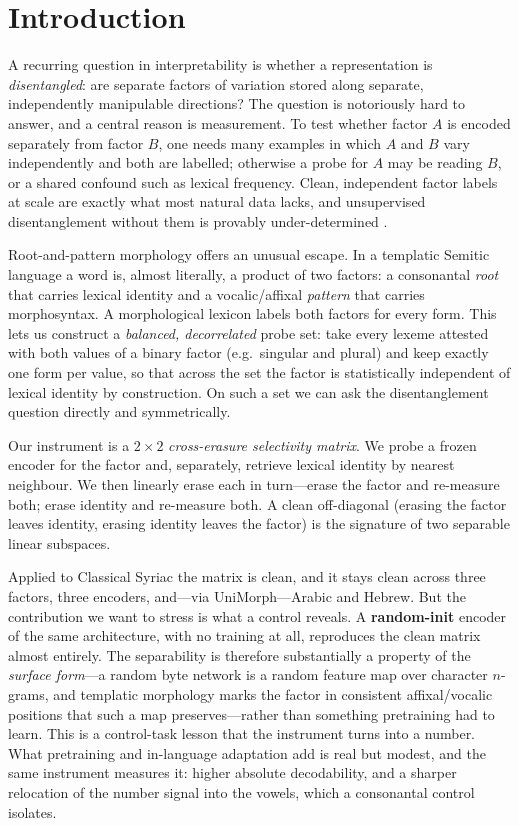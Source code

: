 \documentclass[11pt]{article}
\begin{document}
\section{Introduction}
\label{sec:intro}

A recurring question in interpretability is whether a representation is
\emph{disentangled}: are separate factors of variation stored along separate,
independently manipulable directions? The question is notoriously hard to answer,
and a central reason is measurement. To test whether factor $A$ is encoded
separately from factor $B$, one needs many examples in which $A$ and $B$ vary
independently and both are labelled; otherwise a probe for $A$ may be reading $B$,
or a shared confound such as lexical frequency. Clean, independent factor labels at
scale are exactly what most natural data lacks, and unsupervised disentanglement
without them is provably under-determined \citep{locatello2019challenging}.

Root-and-pattern morphology offers an unusual escape. In a templatic Semitic
language a word is, almost literally, a product of two factors: a consonantal
\emph{root} that carries lexical identity and a vocalic/affixal \emph{pattern} that
carries morphosyntax. A morphological lexicon labels both factors for every form.
This lets us construct a \emph{balanced, decorrelated} probe set: take every lexeme
attested with both values of a binary factor (e.g.\ singular and plural) and keep
exactly one form per value, so that across the set the factor is statistically
independent of lexical identity by construction. On such a set we can ask the
disentanglement question directly and symmetrically.

Our instrument is a $2\times2$ \emph{cross-erasure selectivity matrix}. We probe a
frozen encoder for the factor and, separately, retrieve lexical identity by nearest
neighbour. We then linearly erase each in turn---erase the factor and re-measure
both; erase identity and re-measure both. A clean off-diagonal (erasing the factor
leaves identity, erasing identity leaves the factor) is the signature of two
separable linear subspaces.

Applied to Classical Syriac the matrix is clean, and it stays clean across three
factors, three encoders, and---via UniMorph---Arabic and Hebrew. But the
contribution we want to stress is what a control reveals. A \textbf{random-init}
encoder of the same architecture, with no training at all, reproduces the clean
matrix almost entirely. The separability is therefore substantially a property of
the \emph{surface form}---a random byte network is a random feature map over
character $n$-grams, and templatic morphology marks the factor in consistent
affixal/vocalic positions that such a map preserves---rather than something
pretraining had to learn. This is a control-task lesson \citep{hewitt2019control} that
the instrument turns into a number. What pretraining and in-language adaptation add
is real but modest, and the same instrument measures it: higher absolute
decodability, and a sharper relocation of the number signal into the vowels, which
a consonantal control isolates.
\end{document}
